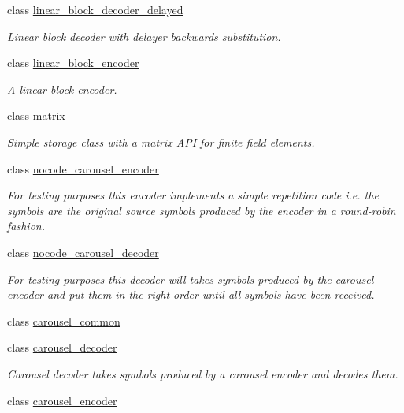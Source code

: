 \begin{DoxyCompactItemize}
class \hyperlink{classkodo_1_1linear__block__decoder__delayed}{linear\-\_\-block\-\_\-decoder\-\_\-delayed}
\begin{DoxyCompactList}\small\item\em Linear block decoder with delayer backwards substitution. \end{DoxyCompactList}\item 
class \hyperlink{classkodo_1_1linear__block__encoder}{linear\-\_\-block\-\_\-encoder}
\begin{DoxyCompactList}\small\item\em A linear block encoder. \end{DoxyCompactList}\item 
class \hyperlink{classkodo_1_1matrix}{matrix}
\begin{DoxyCompactList}\small\item\em Simple storage class with a matrix A\-P\-I for finite field elements. \end{DoxyCompactList}\item 
class \hyperlink{classkodo_1_1nocode__carousel__encoder}{nocode\-\_\-carousel\-\_\-encoder}
\begin{DoxyCompactList}\small\item\em For testing purposes this encoder implements a simple repetition code i.\-e. the symbols are the original source symbols produced by the encoder in a round-\/robin fashion. \end{DoxyCompactList}\item 
class \hyperlink{classkodo_1_1nocode__carousel__decoder}{nocode\-\_\-carousel\-\_\-decoder}
\begin{DoxyCompactList}\small\item\em For testing purposes this decoder will takes symbols produced by the carousel encoder and put them in the right order until all symbols have been received. \end{DoxyCompactList}\item 
class \hyperlink{classkodo_1_1carousel__common}{carousel\-\_\-common}
\item 
class \hyperlink{classkodo_1_1carousel__decoder}{carousel\-\_\-decoder}
\begin{DoxyCompactList}\small\item\em Carousel decoder takes symbols produced by a carousel encoder and decodes them. \end{DoxyCompactList}\item 
class \hyperlink{classkodo_1_1carousel__encoder}{carousel\-\_\-encoder}

\end{DoxyCompactItemize}
